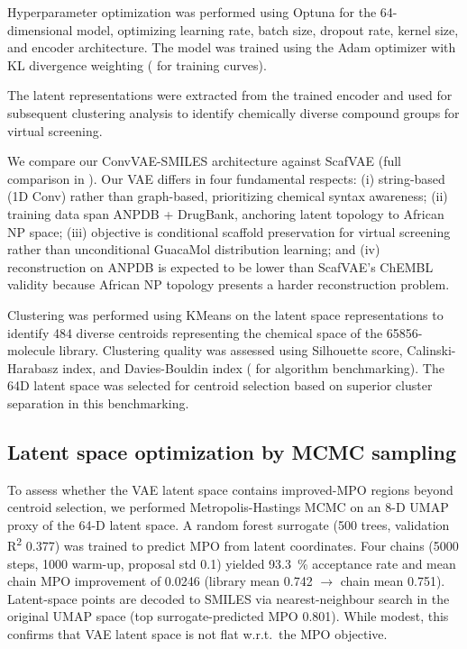 \documentclass[journal=jcisd8,manuscript=article]{achemso}
\begin{document}
Hyperparameter optimization was performed using Optuna \cite{Akiba2019} for the \num{64}-dimensional model, optimizing learning rate, batch size, dropout rate, kernel size, and encoder architecture. The model was trained using the Adam optimizer with KL divergence weighting ( for training curves).

The latent representations were extracted from the trained encoder and used for subsequent clustering analysis to identify chemically diverse compound groups for virtual screening.

We compare our ConvVAE-SMILES architecture against ScafVAE \cite{tiejundong2023scafvae} (full comparison in ). Our VAE differs in four fundamental respects: (i) string-based (1D Conv) rather than graph-based, prioritizing chemical syntax awareness; (ii) training data span ANPDB + DrugBank, anchoring latent topology to African NP space; (iii) objective is conditional scaffold preservation for virtual screening rather than unconditional GuacaMol distribution learning; and (iv) reconstruction on ANPDB is expected to be lower than ScafVAE's ChEMBL validity because African NP topology presents a harder reconstruction problem.

Clustering was performed using KMeans on the latent space representations to identify \num{484} diverse centroids representing the chemical space of the \num{65856}-molecule library. Clustering quality was assessed using Silhouette score, Calinski-Harabasz index, and Davies-Bouldin index ( for algorithm benchmarking). The 64D latent space was selected for centroid selection based on superior cluster separation in this benchmarking.

\subsection{Latent space optimization by MCMC sampling}

To assess whether the VAE latent space contains improved-MPO regions beyond centroid selection, we performed Metropolis-Hastings MCMC on an \num{8}-D UMAP proxy of the \num{64}-D latent space. A random forest surrogate (\num{500} trees, validation R\textsuperscript{2} \num{0.377}) was trained to predict MPO from latent coordinates. Four chains (\num{5000} steps, \num{1000} warm-up, proposal std \num{0.1}) yielded \qty{93.3}{\percent} acceptance rate and mean chain MPO improvement of \num{+0.0246} (library mean \num{0.742} $\to$ chain mean \num{0.751}). Latent-space points are decoded to SMILES via nearest-neighbour search in the original UMAP space (top surrogate-predicted MPO \num{0.801}). While modest, this confirms that VAE latent space is not flat w.r.t.\ the MPO objective.
\end{document}
